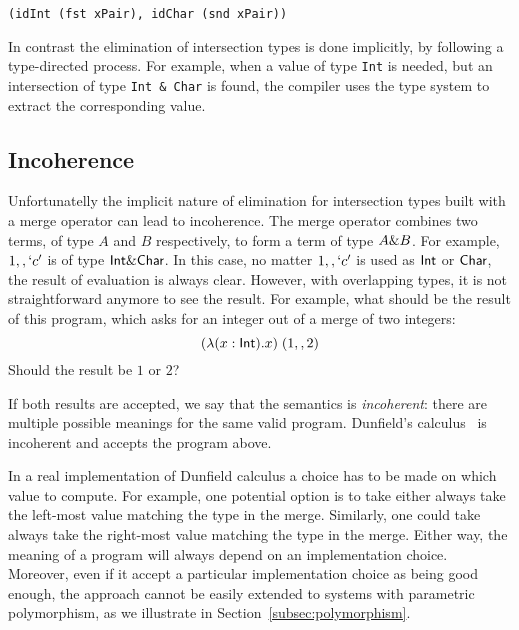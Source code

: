 \begin{lstlisting}
(idInt (fst xPair), idChar (snd xPair))
\end{lstlisting}

\noindent In contrast the elimination of intersection types is done
implicitly, by following a type-directed process. For example,
when a value of type \lstinline{Int} is needed, but an intersection
of type \lstinline{Int & Char} is found, the compiler uses the
type system to extract the corresponding value.

\subsection{Incoherence}\label{subsec:incoherence}
Unfortunatelly the implicit nature of elimination for intersection
types built with a merge operator can lead to incoherence.
The merge operator combines two terms, of type $A$ and $B$
respectively, to form a term of type $A \& B$. For example,
$1 ,, `c'$ is of type $\textsf{Int} \& \textsf{Char}$. In this case, no
matter $1 ,, `c'$ is used as $\textsf{Int}$ or $\textsf{Char}$, the result
of evaluation is always clear. However, with overlapping types, it is
not straightforward anymore to see the result. For example, what
should be the result of this program, which asks for an integer out of
a merge of two integers:
\[ (\lambda (x : \textsf{Int}). x) \; (1 ,, 2) \]
Should the result be $1$ or $2$?

If both results are accepted, we say that the semantics is
\emph{incoherent}: there are multiple possible meanings for the same
valid program. Dunfield's calculus~\cite{dunfield2014elaborating} is incoherent and accepts the
program above.

In a real implementation of Dunfield calculus a choice has to be made
on which value to compute. For example, one potential option is to
take either always take the left-most value matching the type in the
merge. Similarly, one could take always take the right-most
value matching the type in the merge. Either way, the meaning
of a program will always depend on an implementation choice.
Moreover, even if it accept a particular implementation choice as
being good enough, the approach cannot be easily
extended to systems with parametric polymorphism, as we illustrate
in Section~\ref{subsec:polymorphism}.

